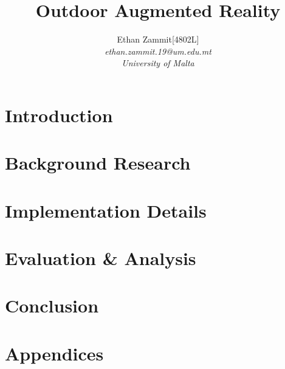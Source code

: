 \documentclass{article}
\title{Outdoor Augmented Reality}
\begin{document}
\author{{Ethan Zammit[4802L]}\\
\textit{ethan.zammit.19@um.edu.mt}\\
\textit{University of Malta}}



\maketitle
\pagebreak

\tableofcontents
\pagebreak


  \section{Introduction}
    

    \section{Background Research}
      
    
  \section{Implementation Details}
    \label{Design}
    

  \section{Evaluation \& Analysis}
  \label{Evaluation}
    

  \section{Conclusion}
  \label{Conclusion}
    



  \pagebreak
  
  

  \pagebreak
  \section{Appendices}
  \label{Appendices}
  
\end{document}
